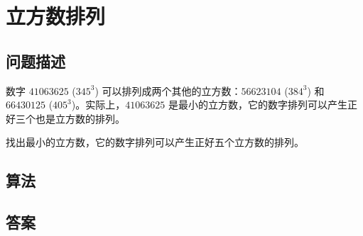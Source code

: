 \section{立方数排列}
\subsection{问题描述}
\begin{tcolorbox}
数字 \(41063625\) (\(345^3\)) 可以排列成两个其他的立方数：\(56623104\) (\(384^3\)) 和 \(66430125\) (\(405^3\))。实际上，\(41063625\) 是最小的立方数，它的数字排列可以产生正好三个也是立方数的排列。

找出最小的立方数，它的数字排列可以产生正好五个立方数的排列。
\end{tcolorbox}

\subsection{算法}


\subsection{答案}
